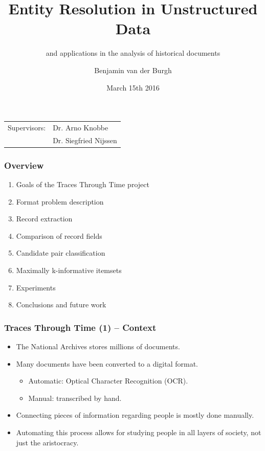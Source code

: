 \documentclass[12pt]{beamer}
\title{Entity Resolution in Unstructured Data}
\subtitle{and applications in the analysis of historical documents}
\author{Benjamin van der Burgh}
\date{March 15th 2016}
\theoremstyle{break}
\begin{document}
\begin{frame}[plain]
\maketitle

\begin{center}
	\footnotesize
	\begin{tabular}[t]{l l}
	Supervisors: & Dr. Arno Knobbe\\
	             & Dr. Siegfried Nijssen
	\end{tabular}%
\end{center}
\end{frame}




\begin{frame}
	\frametitle{Overview}
	
	\begin{enumerate}
		\item Goals of the Traces Through Time project
		\item Format problem description
		\item Record extraction
		\item Comparison of record fields
		\item Candidate pair classification
		\item Maximally k-informative itemsets
		\item Experiments
		\item Conclusions and future work
	\end{enumerate}
\end{frame}




\begin{frame}
	\frametitle{Traces Through Time (1) -- Context}
	
	\begin{itemize}
		\item The National Archives stores millions of documents.
		\item Many documents have been converted to a digital format. \begin{itemize}
				\item Automatic: Optical Character Recognition (OCR).
				\item Manual: transcribed by hand.
				\end{itemize} 
		\item Connecting pieces of information regarding people is mostly done manually.
		\item Automating this process allows for studying people in all layers of society, not just the aristocracy.
	\end{itemize}
	
\end{frame}
\end{document}
